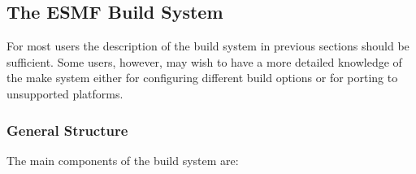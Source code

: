 

\subsection{The ESMF Build System}
\label{sec:make}
For most users the description of the build system in previous
sections should be sufficient.  Some users, however, may wish to have
a more detailed knowledge of the make system either for configuring
different build options or for porting to unsupported platforms.

\subsubsection{General Structure}

The main components of the build system are:

